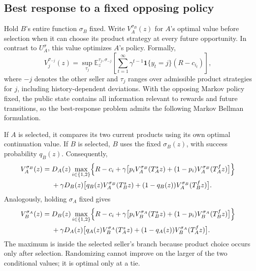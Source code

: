 \documentclass[11pt]{article}
\newcommand{\E}{\mathbb E}
\newcommand{\Ind}[1]{\mathbf 1\{#1\}}
\begin{document}
\subsection{Best response to a fixed opposing policy}

Hold $B$'s entire function $\sigma_B$ fixed. Write $V_A^{\sigma_B}(z)$
for $A$'s optimal value before selection when it can choose its product
strategy at every future opportunity. In contrast to $U_A^\sigma$,
this value optimizes $A$'s policy. Formally,
\begin{equation}\label{eq:best-response-value}
V_j^{\sigma_{-j}}(z)=\sup_{\tau_j}
\E_z^{\tau_j,\sigma_{-j}}\left[
\sum_{t=1}^{\infty}\gamma^{t-1}\Ind{y_t=j}(R-c_{i_t})\right],
\end{equation}
where $-j$ denotes the other seller and $\tau_j$ ranges over admissible
product strategies for $j$, including history-dependent deviations.
With the opposing Markov policy fixed, the public state contains all
information relevant to rewards and future transitions, so the
best-response problem admits the following Markov Bellman formulation.

If $A$ is selected, it compares its two current products using its own
optimal continuation value. If $B$ is selected, $B$ uses the fixed
$\sigma_B(z)$, with success probability $q_B(z)$. Consequently,
\begin{equation}\label{eq:br-a}
\begin{aligned}
V_A^{\sigma_B}(z)={}&D_A(z)\max_{i\in\{1,2\}}
\Bigl\{R-c_i+\gamma\bigl[p_iV_A^{\sigma_B}(T_A^s z)
+(1-p_i)V_A^{\sigma_B}(T_A^f z)\bigr]\Bigr\}\\
&+\gamma D_B(z)\bigl[q_B(z)V_A^{\sigma_B}(T_B^s z)
+(1-q_B(z))V_A^{\sigma_B}(T_B^f z)\bigr].
\end{aligned}
\end{equation}
Analogously, holding $\sigma_A$ fixed gives
\begin{equation}\label{eq:br-b}
\begin{aligned}
V_B^{\sigma_A}(z)={}&D_B(z)\max_{i\in\{1,2\}}
\Bigl\{R-c_i+\gamma\bigl[p_iV_B^{\sigma_A}(T_B^s z)
+(1-p_i)V_B^{\sigma_A}(T_B^f z)\bigr]\Bigr\}\\
&+\gamma D_A(z)\bigl[q_A(z)V_B^{\sigma_A}(T_A^s z)
+(1-q_A(z))V_B^{\sigma_A}(T_A^f z)\bigr].
\end{aligned}
\end{equation}
The maximum is inside the selected seller's branch because product
choice occurs only after selection. Randomizing cannot improve on the
larger of the two conditional values; it is optimal only at a tie.
\end{document}

